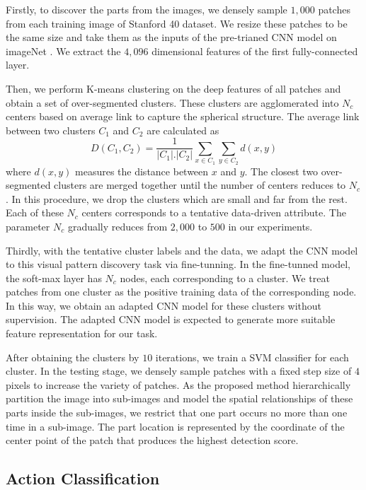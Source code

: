 \documentclass[journal]{IEEEtran}
\begin{document}
Firstly, to discover the parts from the images, we densely sample $ 1,000 $ patches from each training image of Stanford 40 dataset.
We resize these patches to be the same size and take them as the inputs of the pre-trianed CNN model on imageNet \cite{jia2014caffe}. We extract the $ 4,096 $ dimensional features of the first fully-connected layer.


Then, we perform K-means clustering on the deep features of all patches and obtain a set of over-segmented clusters.  These clusters are agglomerated into $ N_c $ centers based on average link \cite{refine_cluster} to capture the spherical structure. The average link between two clusters \textbf{$ C_1 $} and \textbf{$ C_2 $} are calculated as \begin{equation}\label{Cluster_likn} D(C_1,C_2)=\frac{1}{|C_1|.|C_2|}\underset{x\in C_1}{\sum }\underset{y\in C_2}{\sum }d(x,y) \end{equation}  where $ d(x,y) $ measures the distance between $ x $ and $ y $. The closest two over-segmented clusters are merged together until the number of centers reduces to $ N_c $. In this procedure, we drop the clusters which are small and far from the rest. Each of these $ N_c $ centers corresponds to a tentative data-driven attribute. The parameter $ N_c $ gradually reduces from $ 2,000 $ to $ 500 $ in our experiments.


Thirdly, with the tentative cluster labels and the data, we adapt the CNN model to this visual pattern discovery task via fine-tunning. In the fine-tunned model, the soft-max layer has  $ N_c $ nodes, each corresponding to a cluster. We treat patches from one cluster as the positive training data of the corresponding node. In this way, we obtain an adapted CNN model for these clusters without supervision. The adapted CNN model is expected to generate more suitable feature representation for our task.

After obtaining the clusters by $ 10 $ iterations, we train a SVM classifier for each cluster. In the testing stage, we densely sample patches with a fixed step size of $ 4 $ pixels to increase the variety of patches. As the proposed method hierarchically partition the image into sub-images and model the spatial relationships of these parts inside the sub-images, we restrict that one part occurs no more than one time in a sub-image. The part location is represented by the coordinate of the center point of the patch that produces the highest detection score.

\subsection{Action Classification}
\end{document}
